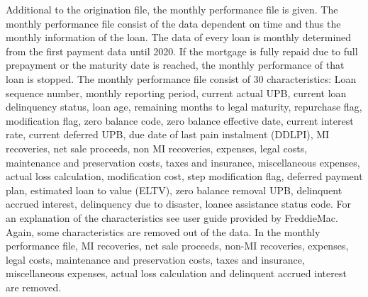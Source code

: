     Additional to the origination file, the monthly performance file is given. The monthly performance file consist of the data dependent on time and thus the monthly information of the loan. The data of every loan is monthly determined from the first payment data until 2020. If the mortgage is fully repaid due to full prepayment or the maturity date is reached, the monthly performance of that loan is stopped. The monthly performance file consist of 30 characteristics: Loan sequence number, monthly reporting period, current actual UPB, current loan delinquency status, loan age, remaining months to legal maturity, repurchase flag, modification flag, zero balance code, zero balance effective date, current interest rate, current deferred UPB, due date of last pain instalment (DDLPI), MI recoveries, net sale  proceeds, non MI recoveries, expenses, legal costs, maintenance and preservation costs, taxes and insurance, miscellaneous expenses, actual loss calculation, modification cost, step modification flag, deferred payment plan, estimated loan to value (ELTV), zero balance removal UPB, delinquent accrued interest, delinquency due to disaster, loanee assistance status code. For an explanation of the characteristics see user guide provided by FreddieMac. Again, some characteristics are removed out of the data. In the monthly performance file, MI recoveries, net sale proceeds, non-MI recoveries, expenses, legal costs, maintenance and preservation costs, taxes and insurance, miscellaneous expenses, actual loss calculation and delinquent accrued interest are removed. 


